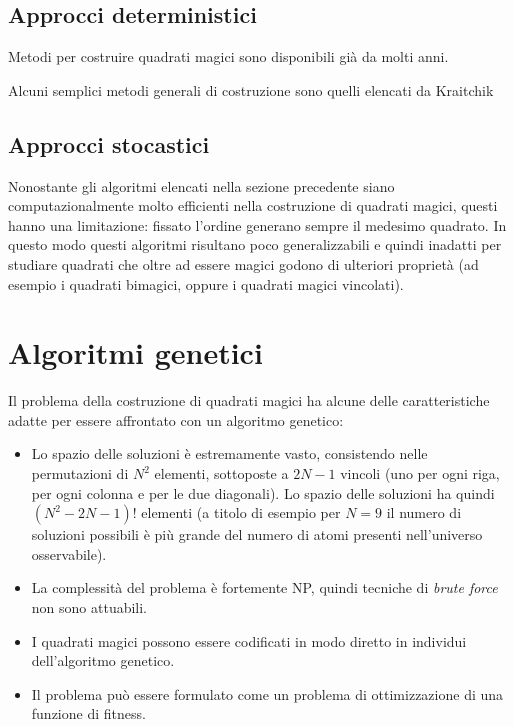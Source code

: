 \documentclass[italian,twoside,twocolumn]{article}
\begin{document}
\subsection{Approcci deterministici}
Metodi per costruire quadrati magici sono disponibili già da molti anni. 

Alcuni semplici metodi generali di costruzione sono quelli elencati da Kraitchik \cite{Krai:1942}

\subsection{Approcci stocastici}
Nonostante gli algoritmi elencati nella sezione precedente siano computazionalmente molto efficienti nella costruzione di quadrati magici, questi hanno una limitazione: fissato l'ordine generano sempre il medesimo quadrato. In questo modo questi algoritmi risultano poco generalizzabili e quindi inadatti per studiare quadrati che oltre ad essere magici godono di ulteriori proprietà (ad esempio i quadrati bimagici, oppure i quadrati magici vincolati). 

\section{Algoritmi genetici}
Il problema della costruzione di quadrati magici ha alcune delle caratteristiche adatte per essere affrontato con un algoritmo genetico:
\begin{itemize}
	\item Lo spazio delle soluzioni è estremamente vasto, consistendo nelle permutazioni di $ N^2 $ elementi, sottoposte a $ 2 N - 1 $ vincoli (uno per ogni riga, per ogni colonna e per le due diagonali). Lo spazio delle soluzioni ha quindi $ (N^2 - 2N - 1)! $ elementi (a titolo di esempio per $ N = 9 $ il numero di soluzioni possibili è più grande del numero di atomi presenti nell'universo osservabile). 
	\item La complessità del problema è fortemente NP, quindi tecniche di \emph{brute force} non sono attuabili.
	\item I quadrati magici possono essere codificati in modo diretto in individui dell'algoritmo genetico.
	\item Il problema può essere formulato come un problema di ottimizzazione di una funzione di fitness.
\end{itemize}
\end{document}
